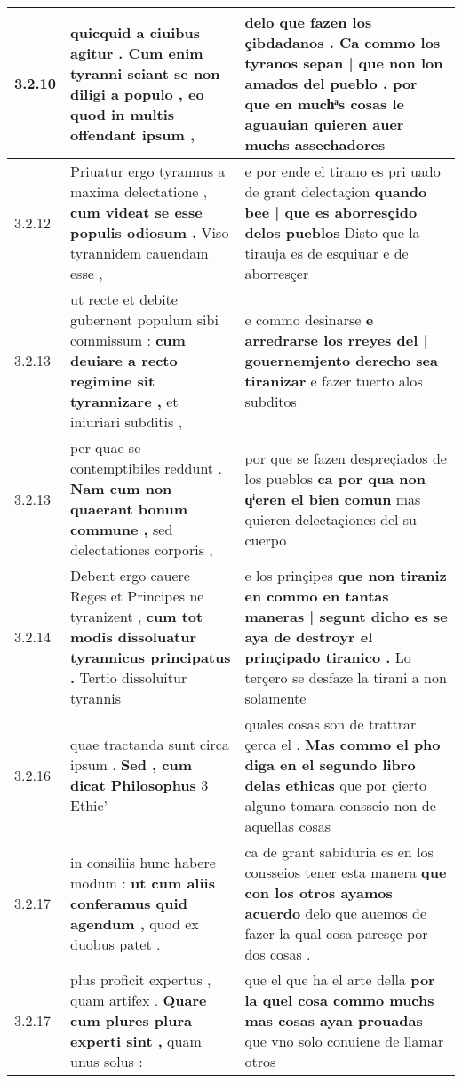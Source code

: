 \begin{tabular}{|p{1cm}|p{6.5cm}|p{6.5cm}|}
3.2.10 & quicquid a ciuibus agitur . \textbf{ Cum enim tyranni sciant se non diligi a populo , } eo quod in multis offendant ipsum , & delo que fazen los çibdadanos . \textbf{ Ca commo los tyranos sepan | que non lon amados del pueblo . } por que en muchͣs cosas le aguauian quieren auer muchs assechadores \\\hline
3.2.12 & Priuatur ergo tyrannus a maxima delectatione , \textbf{ cum videat se esse populis odiosum . } Viso tyrannidem cauendam esse , & e por ende el tirano es pri uado de grant delectaçion \textbf{ quando bee | que es aborresçido delos pueblos } Disto que la tirauja es de esquiuar e de aborresçer \\\hline
3.2.13 & ut recte et debite gubernent populum sibi commissum : \textbf{ cum deuiare a recto regimine sit tyrannizare , } et iniuriari subditis , & e commo desinarse \textbf{ e arredrarse los rreyes del | gouernemjento derecho sea tiranizar } e fazer tuerto alos subditos \\\hline
3.2.13 & per quae se contemptibiles reddunt . \textbf{ Nam cum non quaerant bonum commune , } sed delectationes corporis , & por que se fazen despreçiados de los pueblos \textbf{ ca por qua non qͥeren el bien comun } mas quieren delectaçiones del su cuerpo \\\hline
3.2.14 & Debent ergo cauere Reges et Principes ne tyranizent , \textbf{ cum tot modis dissoluatur tyrannicus principatus . } Tertio dissoluitur tyrannis & e los prinçipes \textbf{ que non tiraniz en commo en tantas maneras | segunt dicho es se aya de destroyr el prinçipado tiranico . } Lo terçero se desfaze la tirani a non solamente \\\hline
3.2.16 & quae tractanda sunt circa ipsum . \textbf{ Sed , cum dicat Philosophus } 3 Ethic’ & quales cosas son de trattrar çerca el . \textbf{ Mas commo el pho diga en el segundo libro delas ethicas } que por çierto alguno tomara consseio non de aquellas cosas \\\hline
3.2.17 & in consiliis hunc habere modum : \textbf{ ut cum aliis conferamus quid agendum , } quod ex duobus patet . & ca de grant sabiduria es en los consseios tener esta manera \textbf{ que con los otros ayamos acuerdo } delo que auemos de fazer la qual cosa paresçe por dos cosas . \\\hline
3.2.17 & plus proficit expertus , quam artifex . \textbf{ Quare cum plures plura experti sint , } quam unus solus : & que el que ha el arte della \textbf{ por la quel cosa commo muchs mas cosas ayan prouadas } que vno solo conuiene de llamar otros \\\hline

\end{tabular}
